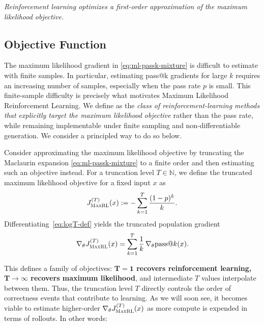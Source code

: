 \documentclass[10pt]{article} %
\begin{document}
\vspace{0.8em}
\begin{center}
\emph{Reinforcement learning optimizes a first-order approximation of the maximum likelihood 
objective.}
\end{center}
\vspace{0.8em}


\subsection{\ours{} Objective Function}
\label{sec:truncated_objectives}
The maximum likelihood gradient in \eqref{eq:ml-passk-mixture} is difficult to estimate with finite samples. In particular, estimating
pass@k gradients for large $k$ requires an increasing number of samples,
especially when the pass rate $p$ is small. 
This finite-sample difficulty is precisely what motivates Maximum Likelihood Reinforcement Learning.
We define \ours{} as the \emph{class of reinforcement-learning methods that
explicitly target the maximum likelihood objective} 
rather than the pass rate, while remaining implementable under finite
sampling and non-differentiable generation. We consider a principled way to do so below.

Consider approximating the
maximum likelihood objective by truncating the Maclaurin expansion \eqref{eq:ml-passk-mixture} to a finite order and then estimating such an objective instead.
For a truncation level $T \in \mathbb{N}$, we define the truncated maximum
likelihood objective for a fixed input $x$ as
\begin{equation}
J_{\textsc{MaxRL}}^{(T)}(x)
:=
-\sum_{k=1}^{T}\frac{(1-p)^k}{k}.
\label{eq:logT-def}
\end{equation}
Differentiating~\eqref{eq:logT-def} yields the truncated population gradient
\begin{equation}
\nabla_\theta J_{\textsc{MaxRL}}^{(T)}(x)
=
\sum_{k=1}^{T}\frac{1}{k}\,
\nabla_\theta \mathrm{pass@}k(x).
\label{eq:logT-passk-mixture}
\end{equation}

This defines a family of objectives: {\bf{$\mathbf{T=1}$ recovers reinforcement learning, $\mathbf{T \to \infty}$ 
recovers maximum likelihood}}, and intermediate $T$ values interpolate between them. Thus, the truncation level $T$ directly controls the order of correctness events that contribute to learning. As we will soon see, it becomes viable to estimate higher-order $\nabla_\theta J_{\textsc{MaxRL}}^{(T)}(x)$ as more compute is expended in terms of rollouts. In other words: 
\end{document}
